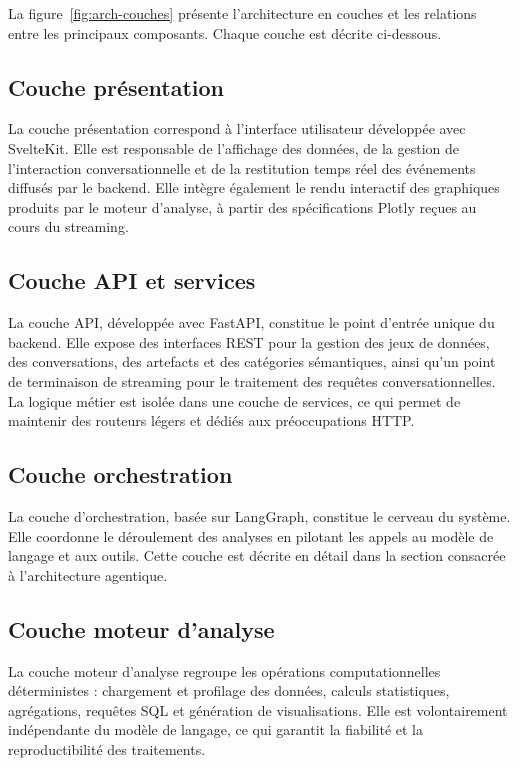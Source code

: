 La figure~\ref{fig:arch-couches} présente l'architecture en couches et les relations entre les principaux composants. Chaque couche est décrite ci-dessous.

\subsection{Couche présentation}

La couche présentation correspond à l'interface utilisateur développée avec SvelteKit. Elle est responsable de l'affichage des données, de la gestion de l'interaction conversationnelle et de la restitution temps réel des événements diffusés par le backend. Elle intègre également le rendu interactif des graphiques produits par le moteur d'analyse, à partir des spécifications Plotly reçues au cours du streaming.

\subsection{Couche API et services}

La couche API, développée avec FastAPI, constitue le point d'entrée unique du backend. Elle expose des interfaces REST pour la gestion des jeux de données, des conversations, des artefacts et des catégories sémantiques, ainsi qu'un point de terminaison de streaming pour le traitement des requêtes conversationnelles. La logique métier est isolée dans une couche de services, ce qui permet de maintenir des routeurs légers et dédiés aux préoccupations HTTP.

\subsection{Couche orchestration}

La couche d'orchestration, basée sur LangGraph, constitue le cerveau du système. Elle coordonne le déroulement des analyses en pilotant les appels au modèle de langage et aux outils. Cette couche est décrite en détail dans la section consacrée à l'architecture agentique.

\subsection{Couche moteur d'analyse}

La couche moteur d'analyse regroupe les opérations computationnelles déterministes : chargement et profilage des données, calculs statistiques, agrégations, requêtes SQL et génération de visualisations. Elle est volontairement indépendante du modèle de langage, ce qui garantit la fiabilité et la reproductibilité des traitements.

